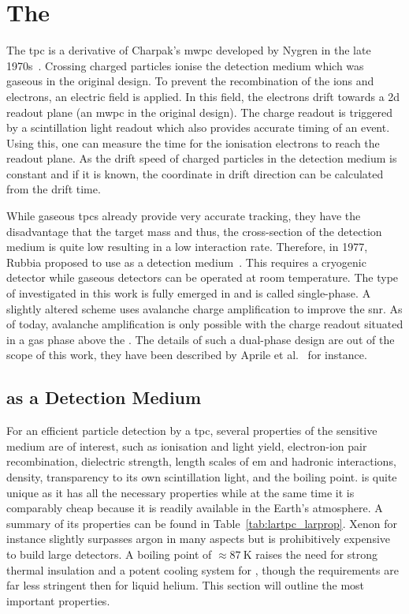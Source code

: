 \chapter{The }
\label{chap:lartpc}

The \gls{tpc} is a derivative of Charpak's \gls{mwpc}\cite{mwpc} developed by Nygren in the late 1970s~\cite{nygrenTPC}.
Crossing charged particles ionise the detection medium which was gaseous in the original design.
To prevent the recombination of the ions and electrons, an electric field is applied.
In this field, the electrons drift towards a \gls{2d} readout plane (an \gls{mwpc} in the original design).
The charge readout is triggered by a scintillation light readout which also provides accurate timing of an event.
Using this, one can measure the time for the ionisation electrons to reach the readout plane.
As the drift speed of charged particles in the detection medium is constant and if it is known, the coordinate in drift direction can be calculated from the drift time.

While gaseous \glspl{tpc} already provide very accurate tracking, they have the disadvantage that the target mass and thus, the cross-section of the detection medium is quite low resulting in a low interaction rate.
Therefore, in 1977, Rubbia proposed to use \lar{} as a detection medium~\cite{lartpc}.
This requires a cryogenic detector while gaseous detectors can be operated at room temperature.
The type of \lartpc{} investigated in this work is fully emerged in \lar{} and is called single-phase.
A slightly altered scheme uses avalanche charge amplification to improve the \gls{snr}.
As of today, avalanche amplification is only possible with the charge readout situated in a gas phase above the \lar{}.
The details of such a dual-phase design are out of the scope of this work, they have been described by Aprile et al.~\cite{NobleGasDetectors} for instance.


\section{ as a Detection Medium}
\label{sec:lartpc_lar}

For an efficient particle detection by a \gls{tpc}, several properties of the sensitive medium are of interest, such as ionisation and light yield, electron-ion pair recombination, dielectric strength, length scales of \gls{em} and hadronic interactions, density, transparency to its own scintillation light, and the boiling point.
\lar{} is quite unique as it has all the necessary properties while at the same time it is comparably cheap because it is readily available in the Earth's atmosphere.
A summary of its properties can be found in Table~\ref{tab:lartpc_larprop}.
Xenon for instance slightly surpasses argon in many aspects but is prohibitively expensive to build large detectors.
A boiling point of $\approx \SI{87}{\kelvin}$ raises the need for strong thermal insulation and a potent cooling system for \lar{}, though the requirements are far less stringent then for liquid helium.
This section will outline the most important \lar{} properties.

